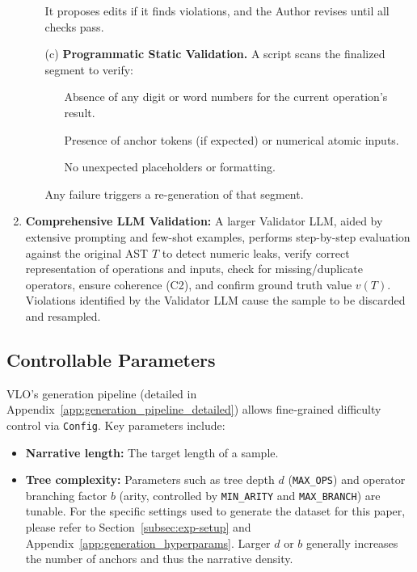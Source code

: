 \documentclass{article}
\begin{document}
\begin{enumerate}
\begin{itemize}
\begin{itemize}
                \end{itemize}
                It proposes edits if it finds violations, and the Author revises until all checks pass.
          \item[(c)] \textbf{Programmatic Static Validation.} A script scans the finalized segment to verify:
                \begin{itemize}
                  \item[\textbullet] Absence of any digit or word numbers for the current operation's result.
                  \item[\textbullet] Presence of anchor tokens (if expected) or numerical atomic inputs.
                  \item[\textbullet] No unexpected placeholders or formatting.
                \end{itemize}
                Any failure triggers a re-generation of that segment.
        \end{itemize}
  \item \textbf{Comprehensive LLM Validation:} A larger Validator LLM, aided by extensive prompting and few-shot examples, performs step-by-step evaluation against the original AST $T$ to detect numeric leaks, verify correct representation of operations and inputs, check for missing/duplicate operators, ensure coherence (C2), and confirm ground truth value $v(T)$.
        Violations identified by the Validator LLM cause the sample to be discarded and resampled.
\end{enumerate}

\subsection{Controllable Parameters}
\label{subsec:params}
VLO's generation pipeline (detailed in Appendix~\ref{app:generation_pipeline_detailed}) allows fine‑grained difficulty control via \texttt{Config}. Key parameters include:
\begin{itemize}
  \item \textbf{Narrative length:} The target length of a sample.
  \item \textbf{Tree complexity:} Parameters such as tree depth $d$ (\texttt{MAX\_OPS}) and operator branching factor $b$ (arity, controlled by \texttt{MIN\_ARITY} and \texttt{MAX\_BRANCH}) are tunable. For the specific settings used to generate the dataset for this paper, please refer to Section~\ref{subsec:exp-setup} and Appendix~\ref{app:generation_hyperparams}. Larger $d$ or $b$ generally increases the number of anchors and thus the narrative density.
\end{itemize}
\end{document}
